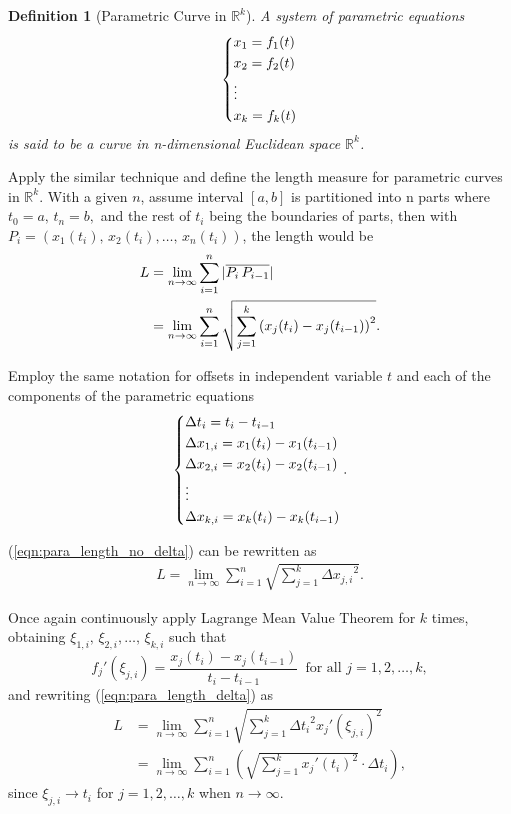 \documentclass[12pt,a4paper]{article}
\newtheorem{definition}{Definition}
\DeclarePairedDelimiter\abs{\lvert}{\rvert}
\newcommand{\eqnref}[1]{(\ref{#1})}
\begin{document}
\begin{definition}[Parametric Curve in $\mathbb{R}^k$]
A system of parametric equations
\[
\begin{dcases}
x_1=f_1(t)\\
x_2=f_2(t)\\
\vdots\\
x_k=f_k(t)
\end{dcases}
\]
is said to be a curve in n-dimensional Euclidean space $\mathbb{R}^k$.
\end{definition}

Apply the similar technique and define the length measure for parametric curves in $\mathbb{R}^k$. With a given $n$, assume interval $[a,b]$ is partitioned into n parts where $t_0=a,\,t_n=b,$ and the rest of $t_i$ being the boundaries of parts, then with $P_i=(x_1(t_i),\,x_2(t_i),\dots,\,x_n(t_i))$, the length would be
\begin{align}
L&=\lim_{n\to\infty}\sum_{i=1}^n\,\abs{\overline{P_i\,P_{i-1}}}\\
\label{eqn:para_length_no_delta}&=\lim_{n\to\infty}\sum_{i=1}^n\sqrt{\sum_{j=1}^k\left(x_j(t_i)-x_j(t_{i-1})\right)^2}.
\end{align}

Employ the same notation for offsets in independent variable $t$ and each of the components of the parametric equations
\[
\begin{dcases}
\Delta t_i=t_i-t_{i-1}\\
\Delta x_{1,i}=x_1(t_i)-x_1(t_{i-1})\\
\Delta x_{2,i}=x_2(t_i)-x_2(t_{i-1})\\
\vdots\\
\Delta x_{k,i}=x_k(t_i)-x_k(t_{i-1})
\end{dcases}.
\]

\eqnref{eqn:para_length_no_delta} can be rewritten as
\begin{gather}
\label{eqn:para_length_delta}
L=\lim_{n\to\infty}\sum_{i=1}^n\sqrt{\sum_{j=1}^k{\Delta x_{j,i}}^2}.
\end{gather}

Once again continuously apply Lagrange Mean Value Theorem \cite{drobisch_rolle_theorem} for $k$ times, obtaining $\xi_{1,i},\,\xi_{2,i},\dots,\,\xi_{k,i}$ such that
\[
{f_j}'(\xi_{j,i})=\frac{x_j(t_i)-x_j(t_{i-1})}{t_i-t_{i-1}}\,\text{ for all } j=1,2,\dots,k,
\]
and rewriting \eqnref{eqn:para_length_delta} as
\begin{align}
L&=\lim_{n\to\infty}\sum_{i=1}^n\sqrt{\sum_{j=1}^k{\Delta t_i}^2{x_j}'(\xi_{j,i})^2}\\
\label{eqn:para_length_riemann_sum}&=\lim_{n\to\infty}\sum_{i=1}^n\left(\sqrt{\sum_{j=1}^k{x_j}'(t_i)^2}\cdot{\Delta t_i}\right),
\end{align}
since $\xi_{j,i}\to t_i$ for $j=1,2,\dots,k$ when $n\to\infty$.
\end{document}
